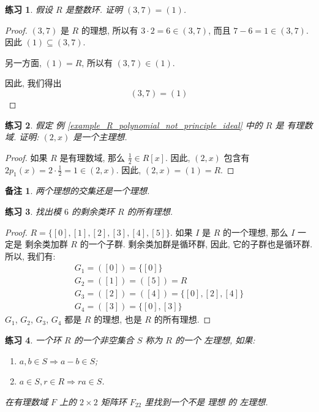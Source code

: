 \documentclass[utf8]{ctexbook}
\newtheorem{memo}{备注}[section]
\newtheorem{exercise}{练习}[section]
\begin{document}
\begin{exercise}
假设 $R$ 是整数环. 证明 $(3, 7) = (1)$.
\end{exercise}


\begin{proof}
$(3,7)$ 是 $R$ 的理想, 所以有 $3 \cdot 2 = 6 \in (3,7)$, 而且 $7 - 6 = 1 \in (3, 7)$. 因此 $(1) \subseteq (3,7)$.

另一方面, $(1) = R$, 所以有 $(3, 7) \in (1)$.

因此, 我们得出
\begin{equation}
(3, 7) = (1) \nonumber
\end{equation}

\end{proof}


\begin{exercise}\label{example_2_x_is_max_ideal}
假定 例 \ref{example_R_polynomial_not_principle_ideal} 中的 $R$ 是 有理数域. 证明: $(2,x)$ 是一个主理想.
\end{exercise}

\begin{proof}
如果 $R$ 是有理数域, 那么 $\frac{1}{2} \in R[x]$. 因此, $(2, x)$ 包含有 $2 p_1(x) = 2 \cdot \frac{1}{2} = 1 \in (2, x)$. 因此, $(2,x) = (1) = R$.
\end{proof}

\begin{memo}
两个理想的交集还是一个理想.
\end{memo}


\begin{exercise}
找出模 $6$ 的剩余类环 $R$ 的所有理想.
\end{exercise}

\begin{proof}
$R =\{[0], [1], [2], [3], [4], [5]  \}$. 如果 $I$ 是 $R$ 的一个理想, 那么 $I$ 一定是 剩余类加群 $R$ 的一个子群. 剩余类加群是循环群, 因此, 它的子群也是循环群. 所以, 我们有:
\begin{align*}
G_1 = ([0]) = \{ [0] \} \\
G_2 = ([1]) = ([5]) = R \\
G_3 = ([2]) = ([4]) = \{ [0], [2], [4] \} \\
G_4 = ([3]) = \{ [0], [3] \}
\end{align*}
$G_1$, $G_2$, $G_3$, $G_4$ 都是 $R$ 的理想, 也是 $R$ 的所有理想.
\end{proof}

\begin{exercise}
一个环 $R$ 的一个非空集合 $S$ 称为 $R$ 的一个 左理想, 如果:
\begin{enumerate}
\item{$a, b\in S \Longrightarrow a-b \in S$;}
\item{$a \in S, r \in R \Longrightarrow r a \in S$.}
\end{enumerate}

在有理数域 $F$ 上的 $2 \times 2$ 矩阵环 $F_{22}$ 里找到一个不是 理想 的 左理想.
\end{exercise}
\end{document}
